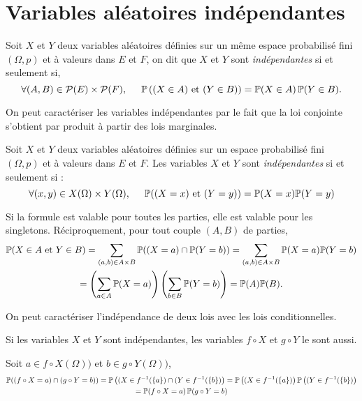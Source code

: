 \section{Variables aléatoires indépendantes}
\begin{defi}
 Soit $X$ et $Y$ deux variables aléatoires définies sur un même espace probabilisé fini $(\Omega,p)$ et à valeurs dans $E$ et $F$, on dit que $X$ et $Y$ sont \emph{indépendantes} si et seulement si,
\begin{displaymath}
\forall (A,B) \in \mathcal{P}(E)\times \mathcal{P}(F), \hspace{0.5cm} \mathbb{P}\left((X\in A)\text{ et } (Y\in B)\right) = \mathbb{P}(X\in A)\, \mathbb{P}(Y\in B).
\end{displaymath}
\end{defi}
On peut caractériser les variables indépendantes par le fait que la loi conjointe s'obtient par produit à partir des lois marginales.
\begin{prop}
Soit $X$ et $Y$ deux variables aléatoires définies sur un espace probabilisé fini $(\Omega,p)$ et à valeurs dans $E$ et $F$. Les variables $X$ et $Y$ sont \emph{indépendantes} si et seulement si :
\begin{displaymath}
 \forall(x,y)\in X(\Omega)\times Y(\Omega),\hspace{0.5cm}
\mathbb{P}((X=x)\text{ et } (Y=y)) = \mathbb{P}(X=x) \mathbb{P}(Y=y)
\end{displaymath}
\end{prop}
\begin{demo}
Si la formule est valable pour toutes les parties, elle est valable pour les singletons. Réciproquement, pour tout couple $(A,B)$ de parties,
\begin{multline*}
 \mathbb{P}(X\in A\text{ et }Y\in B)= \sum_{(a,b)\in A\times B}\mathbb{P}( (X=a)\cap\mathbb{P}(Y=b))
= \sum_{(a,b)\in A\times B}\mathbb{P}(X=a) \mathbb{P}(Y=b)\\
= \left( \sum_{a\in A}\mathbb{P}(X=a)\right) \left( \sum_{b\in B}\mathbb{P}(Y=b)\right) = \mathbb{P}(A) \mathbb{P}(B).
\end{multline*}
\end{demo}
\begin{rem}
 On peut caractériser l'indépendance de deux lois avec les lois conditionnelles.
\end{rem}
\begin{prop}
Si les variables $X$ et $Y$ sont indépendantes, les variables $f\circ X$ et $g\circ Y$ le sont aussi. 
\end{prop}
\begin{demo}
 Soit $a\in f\circ X(\Omega))$ et $b\in g\circ Y(\Omega))$,
\begin{multline*}
 \mathbb{P}((f\circ X=a)\cap (g\circ Y=b)) = \mathbb{P}\left( (X\in f^{-1}(\{a\})\cap (Y\in f^{-1}(\{b\})\right)
 = \mathbb{P}\left( (X\in f^{-1}(\{a\})\right) \mathbb{P}\left(  (Y\in f^{-1}(\{b\})\right)\\
=\mathbb{P}(f\circ X =a) \,\mathbb{P}(g\circ Y =b)
\end{multline*}
\end{demo}

